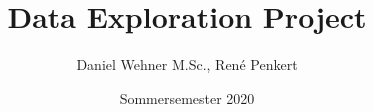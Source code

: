 



\newcommand{\modulkatalog}{\externalurl{https://www.dhbw.de/fileadmin/user/public/SP/MA/Wirtschaftsinformatik/Data_Science.pdf}{Modulkatalog}}
\newcommand{\template}{\externalurl{https://de.overleaf.com/latex/templates/astronomy-and-astrophysics-template/ngdddtchkbcg}{\LaTeX{} Template}}
\newcommand{\curemannheim}{\externalurl{https://curemannheim.de/wp/}{Cure Mannheim e.\,V.}}
\newcommand{\uci}{\externalurl{https://archive.ics.uci.edu/ml/datasets.php}{UCI Machine Learning Repository}}
\newcommand{\airsim}{\externalurl{https://github.com/microsoft/AirSim}{AirSim Simulation}}


\title[Data Exploration Project]{Data Exploration Project}
\author{Daniel Wehner M.Sc., René Penkert}
\date{Sommersemester 2020}




\dwPrintTitle

\dwPrintToc


